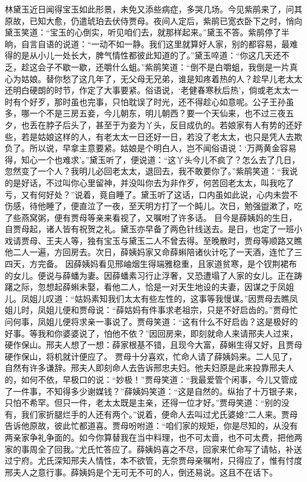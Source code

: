\documentclass[12pt,oneside]{book}
\begin{document}
林黛玉近日闻得宝玉如此形景，未免又添些病症，多哭几场。今见紫鹃来了，问其原故，已知大愈，仍遣琥珀去伏侍贾母。夜间人定后，紫鹃已宽衣卧下之时，悄向黛玉笑道：“宝玉的心倒实，听见咱们去，就那样起来。”黛玉不答。紫鹃停了半晌，自言自语的说道：“一动不如一静。我们这里就算好人家，别的都容易，最难得的是从小儿一处长大，脾气情性都彼此知道的了。”黛玉啐道：“你这几天还不乏，趁这会子不歇一歇，还嚼什么蛆。”紫鹃笑道：“倒不是白嚼蛆，我倒是一片真心为姑娘。替你愁了这几年了，无父母无兄弟，谁是知疼着热的人？趁早儿老太太还明白硬朗的时节，作定了大事要紧。俗语说，‘老健春寒秋后热’，倘或老太太一时有个好歹，那时虽也完事，只怕耽误了时光，还不得趁心如意呢。公子王孙虽多，哪一个不是三房五妾，今儿朝东，明儿朝西？要一个天仙来，也不过三夜五夕，也丢在脖子后头了，甚至于为妾为丫头，反目成仇的。若娘家有人有势的还好些，若是姑娘这样的人，有老太太一日还好一日，若没了老太太，也只是凭人去欺负了。所以说，早拿主意要紧。姑娘是个明白人，岂不闻俗语说：‘万两黄金容易得，知心一个也难求’。”黛玉听了，便说道：“这丫头今儿不疯了？怎么去了几日，忽然变了一个人？我明儿必回老太太，退回去，我不敢要你了。”紫鹃笑道：“我说的是好话，不过叫你心里留神，并没叫你去为非作歹，何苦回老太太，叫我吃了亏，又有何好处？”说着，竟自睡了。黛玉听了这话，口内虽如此说，心内未尝不伤感，待他睡了，便直泣了一夜，至天明方打了一个盹儿。次日，勉强盥漱了，吃了些燕窝粥，便有贾母等亲来看视了，又嘱咐了许多话。
目今是薛姨妈的生日，自贾母起，诸人皆有祝贺之礼。黛玉亦早备了两色针线送去。是日，也定了一班小戏请贾母、王夫人等，独有宝玉与黛玉二人不曾去得。至晚散时，贾母等顺路又瞧他二人一遍，方回房去。次日，薛姨妈家又命薛蝌陪诸伙计吃了一天酒，连忙了三四天，方完备。
因薛姨妈看见邢岫烟生得端雅稳重，且家道贫寒，是个钗荆裙布的女儿。便说与薛蟠为妻。因薛蟠素习行止浮奢，又恐遭塌了人家的女儿。正在踌躇之际，忽想起薛蝌未娶，看他二人，恰是一对天生地设的夫妻，因谋之于凤姐儿。凤姐儿叹道：“姑妈素知我们太太有些左性的，这事等我慢谋。”因贾母去瞧凤姐儿时，凤姐儿便和贾母说：“薛姑妈有件事求老祖宗，只是不好启齿的。”贾母忙问何事，凤姐儿便将求亲一事说了。贾母笑道：“这有什么不好启齿？这是极好的好事。等我和你婆婆说了，怕他不依？”因回房来，即刻就命人来请邢夫人过来，硬作保山。邢夫人想了一想：薛家根基不错，且现今大富，薛蝌生得又好，且贾母硬作保山，将机就计便应了。
贾母十分喜欢，忙命人请了薛姨妈来。二人见了，自然有许多谦辞。邢夫人即刻命人去告诉邢忠夫妇。他夫妇原是此来投靠邢夫人的，如何不依，早极口的说：“妙极！”贾母笑道：“我最爱管个闲事，今儿又管成了一件事，不知得多少谢媒钱？”薛姨妈笑道：“这是自然的。纵抬了十万银子来，只怕不希罕。但只一件，老太太既是主亲，还得一位才好。”贾母笑道：“别的没有，我们家折腿烂手的人还有两个。”说着，便命人去叫过尤氏婆媳?二人来。贾母告诉他原故，彼此忙都道喜。贾母吩咐道：“咱们家的规矩，你是尽知的，从没有两亲家争礼争面的。如今你算替我在当中料理，也不可太啬，也不可太费，把他两家的事周全了回我。”尤氏忙答应了。薛姨妈喜之不尽，回家来忙命写了请帖，补送过宁府。尤氏深知邢夫人情性，本不欲管，无奈贾母亲嘱咐，只得应了，惟有忖度邢夫人之意行事。薛姨妈是个无可无不可的人，倒还易说。这且不在话下。
\end{document}
